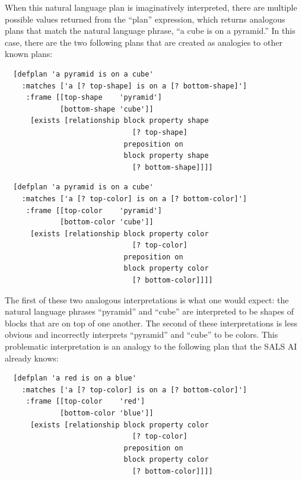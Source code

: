 When this natural language plan is imaginatively interpreted, there
are multiple possible values returned from the ``plan'' expression,
which returns analogous plans that match the natural language phrase,
``a cube is on a pyramid.''  In this case, there are the two following
plans that are created as analogies to other known plans:
\begin{packed_enumerate}
\item{
\begin{samepage}
\begin{Verbatim}
  [defplan 'a pyramid is on a cube'
    :matches ['a [? top-shape] is on a [? bottom-shape]']
     :frame [[top-shape    'pyramid']
             [bottom-shape 'cube']]
      [exists [relationship block property shape
                              [? top-shape]
                            preposition on
                            block property shape
                              [? bottom-shape]]]]
\end{Verbatim}
\end{samepage}
}
\item{
\begin{samepage}
\begin{Verbatim}
  [defplan 'a pyramid is on a cube'
    :matches ['a [? top-color] is on a [? bottom-color]']
     :frame [[top-color    'pyramid']
             [bottom-color 'cube']]
      [exists [relationship block property color
                              [? top-color]
                            preposition on
                            block property color
                              [? bottom-color]]]]
\end{Verbatim}
\end{samepage}
}
\end{packed_enumerate}
The first of these two analogous interpretations is what one would
expect: the natural language phrases ``pyramid'' and ``cube'' are
interpreted to be shapes of blocks that are on top of one another.
The second of these interpretations is less obvious and incorrectly
interprets ``pyramid'' and ``cube'' to be colors.  This problematic
interpretation is an analogy to the following plan that the SALS AI
already knows:
\begin{samepage}
\begin{Verbatim}
  [defplan 'a red is on a blue'
    :matches ['a [? top-color] is on a [? bottom-color]']
     :frame [[top-color    'red']
             [bottom-color 'blue']]
      [exists [relationship block property color
                              [? top-color]
                            preposition on
                            block property color
                              [? bottom-color]]]]
\end{Verbatim}
\end{samepage}
